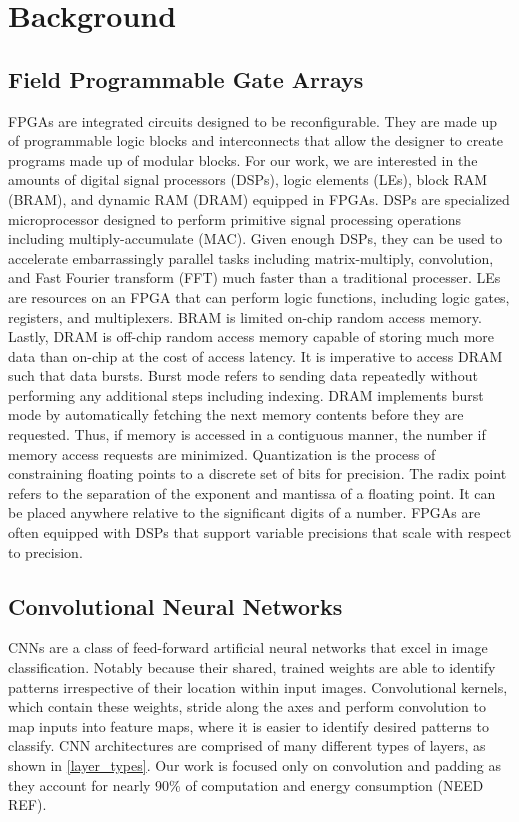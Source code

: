 \chapter{Background}
\section{Field Programmable Gate Arrays}
FPGAs are integrated circuits designed to be reconfigurable. They are made up of programmable logic blocks and interconnects that allow the designer to create programs made up of modular blocks. For our work, we are interested in the amounts of digital signal processors (DSPs), logic elements (LEs), block RAM (BRAM), and dynamic RAM (DRAM) equipped in FPGAs. DSPs are specialized microprocessor designed to perform primitive signal processing operations including multiply-accumulate (MAC). Given enough DSPs, they can be used to accelerate embarrassingly parallel tasks including matrix-multiply, convolution, and Fast Fourier transform (FFT) much faster than a traditional processer. LEs are resources on an FPGA that can perform logic functions, including logic gates, registers, and multiplexers. BRAM is limited on-chip random access memory. Lastly, DRAM is off-chip random access memory capable of storing much more data than on-chip at the cost of access latency. It is imperative to access DRAM such that data bursts. Burst mode refers to sending data repeatedly without performing any additional steps including indexing. DRAM implements burst mode by automatically fetching the next memory contents before they are requested. Thus, if memory is accessed in a contiguous manner, the number if memory access requests are minimized. Quantization is the process of constraining floating points to a discrete set of bits for precision. The radix point refers to the separation of the exponent and mantissa of a floating point. It can be placed anywhere relative to the significant digits of a number. FPGAs are often equipped with DSPs that support variable precisions that scale with respect to precision.

\section{Convolutional Neural Networks}
CNNs are a class of feed-forward artificial neural networks that excel in image classification. Notably because their shared, trained weights are able to identify patterns irrespective of their location within input images. Convolutional kernels, which contain these weights, stride along the axes and perform convolution to map inputs into feature maps, where it is easier to identify desired patterns to classify. CNN architectures are comprised of many different types of layers, as shown in \ref{layer_types}. Our work is focused only on convolution and padding as they account for nearly 90\% of computation and energy consumption (NEED REF).

